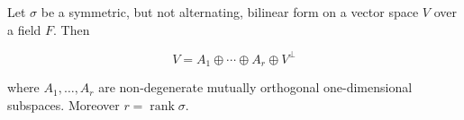 Let $\sigma$ be a symmetric, but not alternating, bilinear form on a vector space $V$ over a field $F$. Then

$$V = A_1 \oplus \cdots \oplus A_r \oplus V^\perp$$

where $A_1, \ldots, A_r$ are non-degenerate mutually orthogonal one-dimensional subspaces. Moreover $r = \operatorname{rank} \sigma$.
